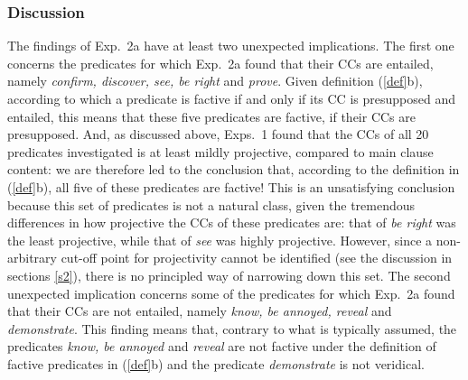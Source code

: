 \documentclass[11pt,fleqn]{article}
\newcommand{\6}{\mbox{$[\hspace*{-.6mm}[$}}
\newcommand{\9}{\mbox{$]\hspace*{-.6mm}]$}}
\begin{document}
\subsubsection{Discussion}

The findings of Exp.~2a have at least two unexpected implications. The first one concerns the predicates for which Exp.~2a found that their CCs are entailed, namely {\em confirm, discover, see, be right} and {\em prove}. Given definition (\ref{def}b), according to which a predicate is factive if and only if its CC is presupposed and entailed, this means that these five predicates are factive, if their CCs are presupposed. And, as discussed above, Exps.~1 found that the CCs of all 20 predicates investigated is at least mildly projective, compared to main clause content: we are therefore led to the conclusion that, according to the definition in (\ref{def}b), all five of these predicates are factive! This is an unsatisfying conclusion because this set of predicates is not a natural class, given the tremendous differences in how projective the CCs of these predicates are: that of {\em be right} was the least projective, while that of {\em see} was highly projective. However, since a non-arbitrary cut-off point for projectivity cannot be identified (see the discussion in sections \ref{s2}), there is no principled way of narrowing down this set. The second unexpected implication concerns some of the predicates for which Exp.~2a found that their CCs are not entailed, namely {\em know, be annoyed, reveal} and {\em demonstrate}. This finding means that, contrary to what is typically assumed, the predicates {\em know, be annoyed} and {\em reveal} are not factive under the definition of factive predicates in (\ref{def}b) and the predicate {\em demonstrate} is not veridical.
\end{document}
